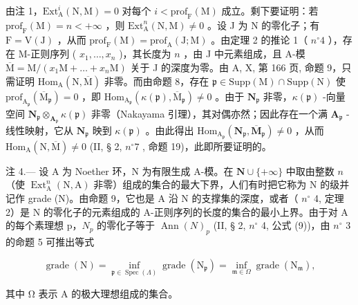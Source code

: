 由注 1，\(\mathrm{Ext}_{\mathrm{A}}^{i}(\mathrm{N},\mathrm{M}) = 0\) 对每个 \(i < \mathrm{prof}_{\mathrm{F}}(\mathrm{M})\) 成立。剩下要证明：若 \(\mathrm{prof}_{\mathrm{F}}(\mathrm{M}) = n < +\infty\) ，则 \(\mathrm{Ext}_{\mathrm{A}}^{n}(\mathrm{N},\mathrm{M}) \neq 0\) 。设 J 为 N 的零化子；有 \(\mathrm{F} = \mathrm{V}(\mathrm{J})\) ，从而 \(\mathrm{prof}_{\mathrm{F}}(\mathrm{M}) = \mathrm{prof}_{\mathrm{A}}(\mathrm{J};\mathrm{M})\) 。由定理 2 的推论 1（ \(n^{\circ}4\) ），存在 M-正则序列 ( \(x_{1},\ldots,x_{n}\) )，其长度为 \(n\) ，由 J 中元素组成，且 A-模 \(\overline{\mathrm{M}} = \mathrm{M}/(x_{1}\mathrm{M}+\ldots+x_{n}\mathrm{M})\) 关于 J 的深度为零。由 A, X, 第 166 页, 命题 9，只需证明 \(\mathrm{Hom}_{\mathrm{A}}(\mathrm{N},\overline{\mathrm{M}})\) 非零。而由命题 8，存在 \(\mathfrak{p} \in \mathrm{Supp}(\mathrm{M}) \cap \mathrm{Supp}(\mathrm{N})\) 使 \(\mathrm{prof}_{\mathrm{A}_{\mathfrak{p}}}(\overline{\mathrm{M}}_{\mathfrak{p}}) = 0\) ，即 \(\mathrm{Hom}_{\mathrm{A}_{\mathfrak{p}}}(\kappa(\mathfrak{p}),\overline{\mathrm{M}}_{\mathfrak{p}}) \neq 0\) 。由于 \(\mathbf{N}_{\mathfrak{p}}\) 非零，\(\kappa(\mathfrak{p})\) -向量空间 \(\mathbf{N}_{\mathfrak{p}} \otimes_{\mathbf{A}_{\mathfrak{p}}} \kappa(\mathfrak{p})\) 非零（Nakayama 引理），其对偶亦然；因此存在一个满 \(\mathbf{A}_{\mathfrak{p}}\) -线性映射，它从 \(\mathbf{N}_{\mathfrak{p}}\) 映到 \(\kappa(\mathfrak{p})\) 。由此得出 \(\mathrm{Hom}_{\mathrm{A}_{\mathfrak{p}}}(\mathbf{N}_{\mathfrak{p}},\overline{\mathbf{M}}_{\mathfrak{p}}) \neq 0\) ，从而 \(\mathrm{Hom}_{\mathrm{A}}(\mathrm{N},\overline{\mathrm{M}}) \neq 0\) (II, § 2, \(n^{\circ}7\) , 命题 19)，此即所要证明的。

注 4.--- 设 A 为 Noether 环，N 为有限生成 A-模。在 \(\mathbf{N}\cup\{+\infty\}\) 中取由整数 \(n\) （使 \(\operatorname{Ext}_{\mathrm{A}}^{n}(\mathrm{N},\mathrm{A})\) 非零）组成的集合的最大下界，人们有时把它称为 N 的级并记作 grade (N)。由命题 9，它也是 A 沿 N 的支撑集的深度，或者（ \(n^{\circ}\) 4, 定理 2）是 N 的零化子的元素组成的 A-正则序列的长度的集合的最小上界。由于对 A 的每个素理想 p，\(N_{p}\) 的零化子等于 \(\operatorname{Ann}(N)_{p}\) (II, § 2, \(n^{\circ}\) 4, 公式 (9))，由 \(n^{\circ}\) 3 的命题 5 可推出等式

\[
\operatorname{grade} (\mathrm{N}) = \inf _ {\mathfrak {p} \in \operatorname{Spec} (\Lambda)} \operatorname{grade} \left(\mathrm{N} _ {\mathfrak {p}}\right) = \inf _ {\mathfrak {m} \in \Omega} \operatorname{grade} \left(\mathrm{N} _ {\mathfrak {m}}\right),
\]

其中 Ω 表示 A 的极大理想组成的集合。

